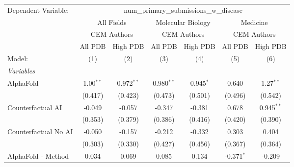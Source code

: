 \begingroup
\centering
\begin{tabular}{lcccccc}
   \tabularnewline \midrule \midrule
   Dependent Variable: & \multicolumn{6}{c}{num\_primary\_submissions\_w\_disease}\\
 & \multicolumn{2}{c}{All Fields} & \multicolumn{2}{c}{Molecular Biology} & \multicolumn{2}{c}{Medicine} \\
\cmidrule(lr){2-3} \cmidrule(lr){4-5} \cmidrule(lr){6-7}
 & \multicolumn{2}{c}{CEM Authors} & \multicolumn{2}{c}{CEM Authors} & \multicolumn{2}{c}{CEM Authors} \\
\cmidrule(lr){2-3} \cmidrule(lr){4-5} \cmidrule(lr){6-7}
 & \multicolumn{1}{c}{All PDB} & \multicolumn{1}{c}{High PDB} & \multicolumn{1}{c}{All PDB} & \multicolumn{1}{c}{High PDB} & \multicolumn{1}{c}{All PDB} & \multicolumn{1}{c}{High PDB} \\
\cmidrule(lr){2-2} \cmidrule(lr){3-3} \cmidrule(lr){4-4} \cmidrule(lr){5-5} \cmidrule(lr){6-6} \cmidrule(lr){7-7}
   Model:                                                     & (1)           & (2)           & (3)           & (4)           & (5)           & (6)\\  
   \midrule
   \emph{Variables}\\
   AlphaFold                                                  & 1.00$^{**}$   & 0.972$^{**}$  & 0.980$^{**}$  & 0.945$^{*}$   & 0.640         & 1.27$^{**}$\\   
                                                              & (0.417)       & (0.423)       & (0.473)       & (0.501)       & (0.496)       & (0.542)\\   
   Counterfactual AI                                          & -0.049        & -0.057        & -0.347        & -0.381        & 0.678         & 0.945$^{**}$\\   
                                                              & (0.353)       & (0.379)       & (0.386)       & (0.416)       & (0.420)       & (0.390)\\   
   Counterfactual No AI                                       & -0.050        & -0.157        & -0.212        & -0.332        & 0.303         & 0.404\\   
                                                              & (0.303)       & (0.330)       & (0.427)       & (0.456)       & (0.367)       & (0.364)\\   
   AlphaFold - Method                                         & 0.034         & 0.069         & 0.085         & 0.134         & -0.371$^{*}$  & -0.209\\   

\end{tabular}
